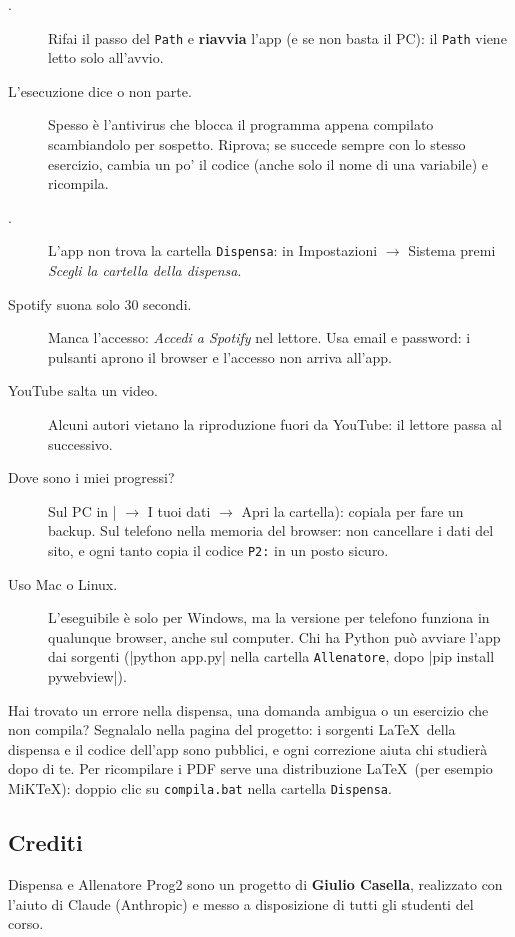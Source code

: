 \begin{description}
  \item[.] Rifai il passo del \texttt{Path} e
        \textbf{riavvia} l'app (e se non basta il PC): il \texttt{Path} viene letto solo
        all'avvio.
  \item[L'esecuzione dice  o non parte.] Spesso è l'antivirus che
        blocca il programma appena compilato scambiandolo per sospetto. Riprova; se
        succede sempre con lo stesso esercizio, cambia un po' il codice (anche solo il
        nome di una variabile) e ricompila.
  \item[.] L'app non trova la cartella \texttt{Dispensa}: in
        Impostazioni $\to$ Sistema premi \emph{Scegli la cartella della dispensa}.
  \item[Spotify suona solo 30 secondi.] Manca l'accesso: \emph{Accedi a Spotify} nel
        lettore. Usa email e password: i pulsanti  aprono il
        browser e l'accesso non arriva all'app.
  \item[YouTube salta un video.] Alcuni autori vietano la riproduzione fuori da YouTube:
        il lettore passa al successivo.
  \item[Dove sono i miei progressi?] Sul PC in \cc|%
        $\to$ I tuoi dati $\to$ Apri la cartella): copiala per fare un backup. Sul telefono
        nella memoria del browser: non cancellare i dati del sito, e ogni tanto copia il
        codice \texttt{P2:} in un posto sicuro.
  \item[Uso Mac o Linux.] L'eseguibile è solo per Windows, ma la versione per telefono
        funziona in qualunque browser, anche sul computer. Chi ha Python può avviare l'app
        dai sorgenti (\cc|python app.py| nella cartella \texttt{Allenatore}, dopo
        \cc|pip install pywebview|).
\end{description}

\begin{consiglio}
Hai trovato un errore nella dispensa, una domanda ambigua o un esercizio che non compila?
Segnalalo nella pagina del progetto: i sorgenti \LaTeX\ della dispensa e il codice
dell'app sono pubblici, e ogni correzione aiuta chi studierà dopo di te. Per ricompilare
i PDF serve una distribuzione \LaTeX\ (per esempio MiKTeX): doppio clic su
\texttt{compila.bat} nella cartella \texttt{Dispensa}.
\end{consiglio}

\subsection*{Crediti}
Dispensa e Allenatore Prog2 sono un progetto di \textbf{Giulio Casella}, realizzato con
l'aiuto di Claude (Anthropic) e messo a disposizione di tutti gli studenti del corso.

